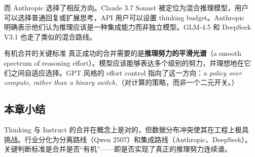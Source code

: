 而 Anthropic 选择了相反方向。Claude 3.7 Sonnet 被定位为混合推理模型，用户可以选择普通回复或扩展思考，API 用户可以设置 thinking budget。Anthropic 明确表示他们认为推理应该是一种集成能力而非独立模型。GLM-4.5 和 DeepSeek V3.1 也走了类似的混合路线。

\begin{importantbox}{有机合并的关键标准}
真正成功的合并需要的是\textbf{推理努力的平滑光谱}（a smooth spectrum of reasoning effort）。模型应该能够表达多个级别的努力，并理想地在它们之间自适应选择。GPT 风格的 effort control 指向了这一方向：\textit{a policy over compute, rather than a binary switch.}（对计算的策略，而非一个二元开关。）
\end{importantbox}

\subsection{本章小结}

Thinking 与 Instruct 的合并在概念上是对的，但数据分布冲突使其在工程上极具挑战。行业分化为分离路线（Qwen 2507）和集成路线（Anthropic、DeepSeek）。关键判断标准是合并是否``有机''——即是否实现了真正的推理努力连续谱。


